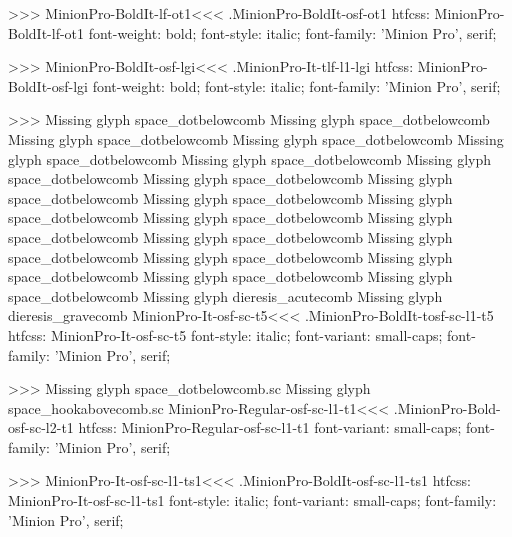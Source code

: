 {>>>
\<MinionPro-BoldIt-lf-ot1\><<<
.MinionPro-BoldIt-osf-ot1
htfcss:  MinionPro-BoldIt-lf-ot1  font-weight: bold; font-style: italic; font-family: 'Minion Pro', serif;

>>>
\<MinionPro-BoldIt-osf-lgi\><<<
.MinionPro-It-tlf-l1-lgi
htfcss:  MinionPro-BoldIt-osf-lgi  font-weight: bold; font-style: italic; font-family: 'Minion Pro', serif;

>>>
Missing glyph	space_dotbelowcomb
Missing glyph	space_dotbelowcomb
Missing glyph	space_dotbelowcomb
Missing glyph	space_dotbelowcomb
Missing glyph	space_dotbelowcomb
Missing glyph	space_dotbelowcomb
Missing glyph	space_dotbelowcomb
Missing glyph	space_dotbelowcomb
Missing glyph	space_dotbelowcomb
Missing glyph	space_dotbelowcomb
Missing glyph	space_dotbelowcomb
Missing glyph	space_dotbelowcomb
Missing glyph	space_dotbelowcomb
Missing glyph	space_dotbelowcomb
Missing glyph	space_dotbelowcomb
Missing glyph	space_dotbelowcomb
Missing glyph	space_dotbelowcomb
Missing glyph	space_dotbelowcomb
Missing glyph	space_dotbelowcomb
Missing glyph	dieresis_acutecomb
Missing glyph	dieresis_gravecomb
\<MinionPro-It-osf-sc-t5\><<<
.MinionPro-BoldIt-tosf-sc-l1-t5
htfcss:  MinionPro-It-osf-sc-t5  font-style: italic; font-variant: small-caps; font-family: 'Minion Pro', serif;

>>>
Missing glyph	space_dotbelowcomb.sc
Missing glyph	space_hookabovecomb.sc
\<MinionPro-Regular-osf-sc-l1-t1\><<<
.MinionPro-Bold-osf-sc-l2-t1
htfcss:  MinionPro-Regular-osf-sc-l1-t1  font-variant: small-caps; font-family: 'Minion Pro', serif;

>>>
\<MinionPro-It-osf-sc-l1-ts1\><<<
.MinionPro-BoldIt-osf-sc-l1-ts1
htfcss:  MinionPro-It-osf-sc-l1-ts1  font-style: italic; font-variant: small-caps; font-family: 'Minion Pro', serif;

}
